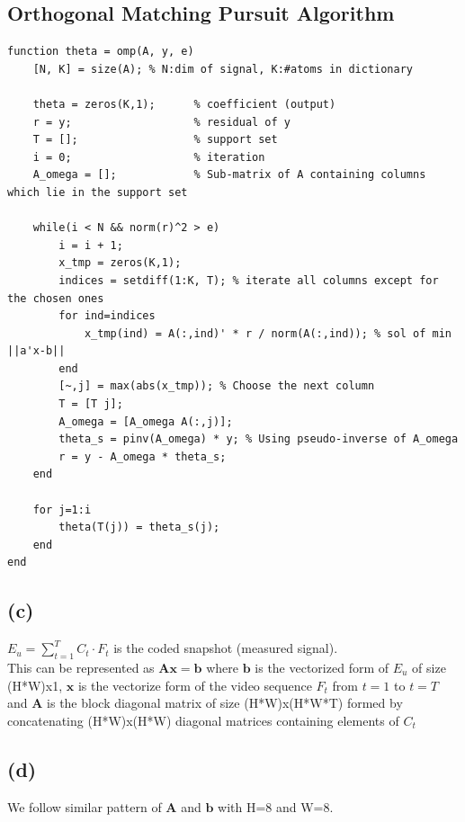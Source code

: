 \documentclass[fleqn, 11pt]{article}
\begin{document}
\subsection*{Orthogonal Matching Pursuit Algorithm}
\begin{verbatim}
function theta = omp(A, y, e)
    [N, K] = size(A); % N:dim of signal, K:#atoms in dictionary

    theta = zeros(K,1);      % coefficient (output)
    r = y;                   % residual of y
    T = [];                  % support set
    i = 0;                   % iteration
    A_omega = [];            % Sub-matrix of A containing columns which lie in the support set

    while(i < N && norm(r)^2 > e)
        i = i + 1;
        x_tmp = zeros(K,1);
        indices = setdiff(1:K, T); % iterate all columns except for the chosen ones
        for ind=indices
            x_tmp(ind) = A(:,ind)' * r / norm(A(:,ind)); % sol of min ||a'x-b||
        end
        [~,j] = max(abs(x_tmp)); % Choose the next column
        T = [T j];
        A_omega = [A_omega A(:,j)];
        theta_s = pinv(A_omega) * y; % Using pseudo-inverse of A_omega
        r = y - A_omega * theta_s;
    end

    for j=1:i
        theta(T(j)) = theta_s(j);
    end
end
\end{verbatim}

\subsection*{(c)}
$E_u = \sum_{t=1}^T C_t \cdot F_t$ is the coded snapshot (measured signal). \\
This can be represented as $\boldsymbol{A} \boldsymbol{x} = \boldsymbol{b}$ where $\boldsymbol{b}$ is the vectorized form of $E_u$ of size (H*W)x1, $\boldsymbol{x}$ is the vectorize form of the video sequence $F_t$ from $t=1$ to $t=T$ and $\boldsymbol{A}$ is the block diagonal matrix of size (H*W)x(H*W*T) formed by concatenating (H*W)x(H*W) diagonal matrices containing elements of $C_t$

\subsection*{(d)}
We follow similar pattern of $\boldsymbol{A}$ and $\boldsymbol{b}$ with H=8 and W=8. \\
\end{document}
